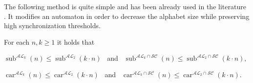 \documentclass{ws-ijmpc}
\DeclareMathOperator{\car}{car}
\DeclareMathOperator{\sub}{sub}
\begin{document}
The following method is quite simple and has been already used in
the literature \citep{BER4}. It modifies an automaton in order to
decrease the alphabet size while preserving high synchronization thresholds. 
\begin{lemma}
\label{lem: bin}For each $n,k\ge1$ it holds that\end{lemma}
\begin{romanlist}
\item $\sub^{\mathcal{AL}_{k}}\!\left(n\right)\le\sub^{\mathcal{AL}_{2}}\!\left(k\cdot n\right)$
~and~ $\sub^{\mathcal{AL}_{k}\cap\mathcal{SC}}\!\left(n\right)\le\sub^{\mathcal{AL}_{2}\cap\mathcal{SC}}\!\left(k\cdot n\right),$
\item $\car^{\mathcal{AL}_{k}}\!\left(n\right)\le\car^{\mathcal{AL}_{2}}\!\left(k\cdot n\right)$
~and~ $\car^{\mathcal{AL}_{k}\cap\mathcal{SC}}\!\left(n\right)\le\car^{\mathcal{AL}_{2}\cap\mathcal{SC}}\!\left(k\cdot n\right).$\end{romanlist}
\end{document}

